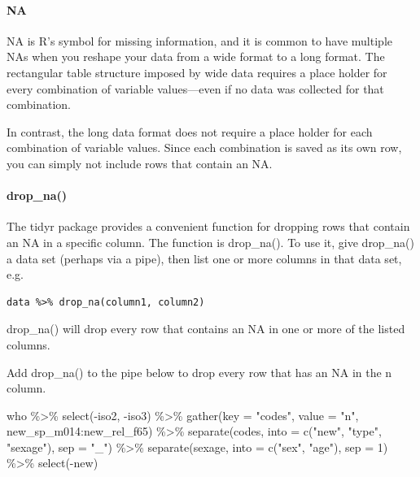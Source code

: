 \documentclass[
]{article}
\newenvironment{Shaded}{\begin{snugshade}}{\end{snugshade}}
\newcommand{\AttributeTok}[1]{\textcolor[rgb]{0.77,0.63,0.00}{#1}}
\newcommand{\DecValTok}[1]{\textcolor[rgb]{0.00,0.00,0.81}{#1}}
\newcommand{\FunctionTok}[1]{\textcolor[rgb]{0.00,0.00,0.00}{#1}}
\newcommand{\NormalTok}[1]{#1}
\newcommand{\SpecialCharTok}[1]{\textcolor[rgb]{0.00,0.00,0.00}{#1}}
\newcommand{\StringTok}[1]{\textcolor[rgb]{0.31,0.60,0.02}{#1}}
\begin{document}
\hypertarget{na}{%
\paragraph{NA}\label{na}}

NA is R's symbol for missing information, and it is common to have
multiple NAs when you reshape your data from a wide format to a long
format. The rectangular table structure imposed by wide data requires a
place holder for every combination of variable values---even if no data
was collected for that combination.

In contrast, the long data format does not require a place holder for
each combination of variable values. Since each combination is saved as
its own row, you can simply not include rows that contain an NA.

\hypertarget{drop_na}{%
\paragraph{drop\_na()}\label{drop_na}}

The tidyr package provides a convenient function for dropping rows that
contain an NA in a specific column. The function is drop\_na(). To use
it, give drop\_na() a data set (perhaps via a pipe), then list one or
more columns in that data set, e.g.

\begin{verbatim}
data %>% drop_na(column1, column2)
\end{verbatim}

drop\_na() will drop every row that contains an NA in one or more of the
listed columns.

Add drop\_na() to the pipe below to drop every row that has an NA in the
n column.

\begin{Shaded}
\begin{Highlighting}[]
\NormalTok{who }\SpecialCharTok{\%\textgreater{}\%}
  \FunctionTok{select}\NormalTok{(}\SpecialCharTok{{-}}\NormalTok{iso2, }\SpecialCharTok{{-}}\NormalTok{iso3) }\SpecialCharTok{\%\textgreater{}\%} 
  \FunctionTok{gather}\NormalTok{(}\AttributeTok{key =} \StringTok{"codes"}\NormalTok{, }\AttributeTok{value =} \StringTok{"n"}\NormalTok{, new\_sp\_m014}\SpecialCharTok{:}\NormalTok{new\_rel\_f65) }\SpecialCharTok{\%\textgreater{}\%} 
  \FunctionTok{separate}\NormalTok{(codes, }\AttributeTok{into =} \FunctionTok{c}\NormalTok{(}\StringTok{"new"}\NormalTok{, }\StringTok{"type"}\NormalTok{, }\StringTok{"sexage"}\NormalTok{), }\AttributeTok{sep =} \StringTok{"\_"}\NormalTok{) }\SpecialCharTok{\%\textgreater{}\%} 
  \FunctionTok{separate}\NormalTok{(sexage, }\AttributeTok{into =} \FunctionTok{c}\NormalTok{(}\StringTok{"sex"}\NormalTok{, }\StringTok{"age"}\NormalTok{), }\AttributeTok{sep =} \DecValTok{1}\NormalTok{) }\SpecialCharTok{\%\textgreater{}\%} 
  \FunctionTok{select}\NormalTok{(}\SpecialCharTok{{-}}\NormalTok{new)}
\end{Highlighting}
\end{Shaded}
\end{document}
